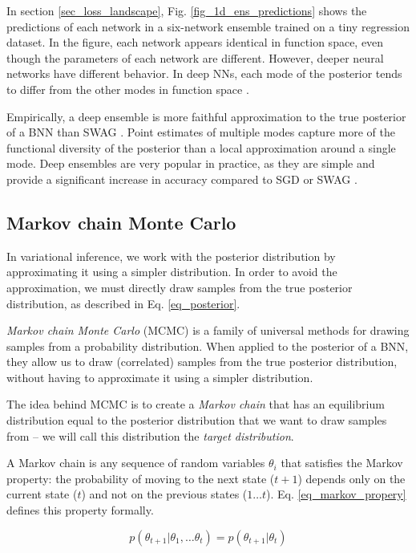 \documentclass[12pt]{article}
\begin{document}
{In section \ref{sec_loss_landscape}, Fig. \ref{fig_1d_ens_predictions} shows the predictions of each network in a six-network ensemble trained on a tiny regression dataset. In the figure, each network appears identical in function space, even though the parameters of each network are different. However, deeper neural networks have different behavior. In deep NNs, each mode of the posterior tends to differ from the other modes in function space \cite{deep_ens}.

Empirically, a deep ensemble is more faithful approximation to the true posterior of a BNN than SWAG \cite{bnn_posterior}. Point estimates of multiple modes capture more of the functional diversity of the posterior than a local approximation around a single mode. Deep ensembles are very popular in practice, as they are simple and provide a significant increase in accuracy compared to SGD or SWAG \cite{multiswag}.

\subsection{Markov chain Monte Carlo}
\label{sec_mcmc}

In variational inference, we work with the posterior distribution by approximating it using a simpler distribution. In order to avoid the approximation, we must directly draw samples from the true posterior distribution, as described in Eq. \ref{eq_posterior}.

\textit{Markov chain Monte Carlo} (MCMC) is a family of universal methods for drawing samples from a probability distribution. When applied to the posterior of a BNN, they allow us to draw (correlated) samples from the true posterior distribution, without having to approximate it using a simpler distribution.

The idea behind MCMC is to create a \textit{Markov chain} that has an equilibrium distribution equal to the posterior distribution that we want to draw samples from -- we will call this distribution the \textit{target distribution}.

A Markov chain is any sequence of random variables $\theta_i$ that satisfies the Markov property: the probability of moving to the next state ($t+1$) depends only on the current state ($t$) and not on the previous states ($1 \ldots t$). Eq. \ref{eq_markov_propery} defines this property formally.

\begin{equation}
p(\theta_{t+1}|\theta_1,\ldots \theta_t)=p(\theta_{t+1}|\theta_t)
\label{eq_markov_propery}
\end{equation}

}
\end{document}
